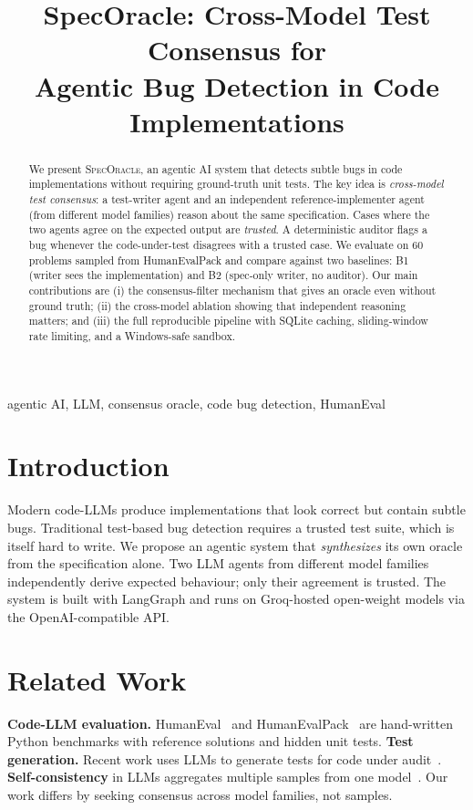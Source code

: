 \documentclass[conference]{IEEEtran}
\title{SpecOracle: Cross-Model Test Consensus for\\
Agentic Bug Detection in Code Implementations}
\author{
\IEEEauthorblockN{Anonymous Author}
\IEEEauthorblockA{Department of Computing --- Decision and Computing Sciences\\
Coimbatore Institute of Technology, Coimbatore --- 641014\\
Course: 22MDCEL11 AI Systems Engineering for Agentic Workflows Laboratory}
}
\begin{document}
\maketitle

\begin{abstract}
We present \textsc{SpecOracle}, an agentic AI system that detects subtle
bugs in code implementations without requiring ground-truth unit tests. The
key idea is \emph{cross-model test consensus}: a test-writer agent and an
independent reference-implementer agent (from different model families) reason
about the same specification. Cases where the two agents agree on the expected
output are \emph{trusted}. A deterministic auditor flags a bug whenever the
code-under-test disagrees with a trusted case. We evaluate on 60 problems
sampled from HumanEvalPack and compare against two baselines: B1 (writer sees
the implementation) and B2 (spec-only writer, no auditor). Our main
contributions are (i) the consensus-filter mechanism that gives an oracle
even without ground truth; (ii) the cross-model ablation showing that
independent reasoning matters; and (iii) the full reproducible pipeline with
SQLite caching, sliding-window rate limiting, and a Windows-safe sandbox.
\end{abstract}

\begin{IEEEkeywords}
agentic AI, LLM, consensus oracle, code bug detection, HumanEval
\end{IEEEkeywords}

\section{Introduction}
Modern code-LLMs produce implementations that look correct but contain subtle
bugs. Traditional test-based bug detection requires a trusted test suite, which
is itself hard to write. We propose an agentic system that \emph{synthesizes}
its own oracle from the specification alone. Two LLM agents from different
model families independently derive expected behaviour; only their agreement
is trusted. The system is built with LangGraph and runs on Groq-hosted
open-weight models via the OpenAI-compatible API.

\section{Related Work}
\textbf{Code-LLM evaluation.} HumanEval~\cite{chen2021codex} and
HumanEvalPack~\cite{muennighoff2023octopack} are hand-written Python benchmarks
with reference solutions and hidden unit tests. \textbf{Test generation.}
Recent work uses LLMs to generate tests for code under
audit~\cite{lemieux2023coda}. \textbf{Self-consistency} in LLMs aggregates
multiple samples from one model~\cite{wang2023selfconsistency}. Our work
differs by seeking consensus across model families, not samples.
\end{document}
